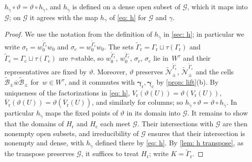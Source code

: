 \documentclass[a4paper]{amsart}
\numberwithin{equation}{section}
\theoremstyle{definition}
\theoremstyle{remark}
\newcommand{\mcG}{\mathcal{G}}
\newcommand{\mcN}{\mathcal{N}}
\newcommand{\mcB}{\mathcal{B}}
\newcommand{\tg}{\widetilde{\gamma}}
\newcommand{\vt}{\vartheta}
\newcommand{\rr}{\mathrm{r}}
\newcommand{\cc}{\mathrm{c}}
\begin{document}
\begin{proposition}
  \label{prop: h theta}
  $h_{\tg}\circ\vt=\vt\circ h_{\tg}$, and $h_{\tg}$ is defined on a dense open subset of $\mcG$, which it maps into $\mcG$; on $\mcG$ it agrees with the map $h_\gamma$ of \eqref{eq: h} for $\mcG$ and $\gamma$.
\end{proposition}
\begin{proof}
  We use the notation from the definition of $h_{\tg}$ in \cref{sec: h}; in particular we write $\sigma_{\rr}=w_0^{\widetilde{\Gamma}_{\rr}}w_0$ and $\sigma_{\cc}=w_0^{\widetilde{\Gamma}_{\cc}}w_0$.
  The sets $\widetilde{\Gamma}_{\rr}=\Gamma_{\rr}\sqcup\tau(\Gamma_{\rr})$ and $\widetilde{\Gamma}_{\cc}=\Gamma_{\cc}\sqcup\tau(\Gamma_{\cc})$ are $\tau$-stable, so $w_0^{\widetilde{\Gamma}_{\rr}}$, $w_0^{\widetilde{\Gamma}_{\cc}}$, $\sigma_{\rr}$, $\sigma_{\cc}$ lie in~$W^\tau$ and their representatives are fixed by $\vt$.
  Moreover, $\vt$ preserves $\widetilde{\mcN}_\pm^{\widetilde{\Gamma}_{\rr}}$, $\widetilde{\mcN}_\pm^{\widetilde{\Gamma}_{\cc}}$ and the cells $\widetilde{\mcB}_\pm\overline{w}\widetilde{\mcB}_\pm$ for~$w\in W^\tau$, and it commutes with $\boldsymbol\gamma_{\rr},\boldsymbol\gamma_{\cc}$ by \cref{prop: lift}(b).
  By uniqueness of the factorizations in \eqref{eq: h}, $V_{\rr}(\vt(U))=\vt(V_{\rr}(U))$, $\overline{V}_{\rr}(\vt(U))=\vt(\overline{V}_{\rr}(U))$, and similarly for columns; so $h_{\tg}\circ\vt=\vt\circ h_{\tg}$.
  In particular $h_{\tg}$ maps the fixed points of $\vt$ in its domain into $\mcG$.
  It remains to show that the domains of $H_{\rr}$ and $H_{\cc}$ each meet $\mcG$.
  Their intersections with $\mcG$ are then nonempty open subsets, and irreducibility of $\mcG$ ensures that their intersection is nonempty and dense, with $h_{\tg}$ defined there by \eqref{eq: h}.
  By \cref{lem: h transpose}, as the transpose preserves $\mcG$, it suffices to treat $H_{\rr}$; write $K=\widetilde{\Gamma}_{\rr}$.


\end{proof}
\end{document}
